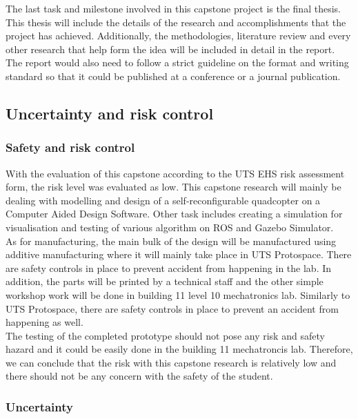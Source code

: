 \documentclass[12pt,A4]{article}
\begin{document}
	The last task and milestone involved in this capstone project is the final thesis. This thesis will include the details of the research and accomplishments that the project has achieved. Additionally, the methodologies, literature review and every other research that help form the idea will be included in detail in the report. The report would also need to follow a strict guideline on the format and writing standard so that it could be published at a conference or a journal publication.\\
	
	\subsection{Uncertainty and risk control}
	
	\subsubsection{Safety and risk control}
	
	With the evaluation of this capstone according to the UTS EHS risk assessment form, the risk level was evaluated as low. This capstone research will mainly be dealing with modelling and design of a self-reconfigurable quadcopter on a Computer Aided Design Software. Other task includes creating a simulation for visualisation and testing of various algorithm on ROS and Gazebo Simulator.\\
	
	As for manufacturing, the main bulk of the design will be manufactured using additive manufacturing where it will mainly take place in UTS Protospace. There are safety controls in place to prevent accident from happening in the lab. In addition, the parts will be printed by a technical staff and the other simple workshop work will be done in building 11 level 10 mechatronics lab. Similarly to UTS Protospace, there are safety controls in place to prevent an accident from happening as well.\\
	
	The testing of the completed prototype should not pose any risk and safety hazard and it could be easily done in the building 11 mechatroncis lab. Therefore, we can conclude that the risk with this capstone research is relatively low and there should not be any concern with the safety of the student.
	
	\subsubsection{Uncertainty}
	
\end{document}
